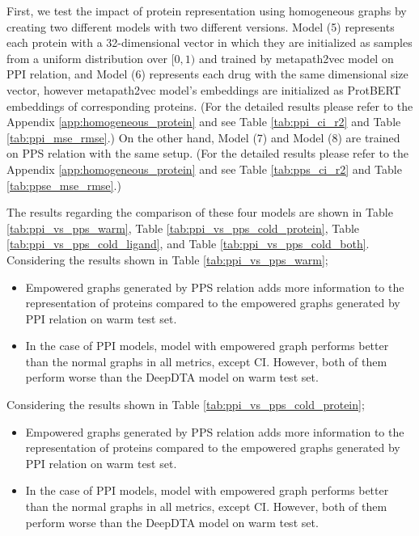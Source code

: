 First, we test the impact of protein representation using homogeneous graphs by creating two different models with two different versions. Model (5) represents each protein with a 32-dimensional vector in which they are initialized as samples from a uniform distribution over $[0, 1)$ and trained by metapath2vec model on PPI relation, and Model (6) represents each drug with the same dimensional size vector, however metapath2vec model's embeddings are initialized as ProtBERT embeddings of corresponding proteins. (For the detailed results please refer to the Appendix \ref{app:homogeneous_protein} and see Table \ref{tab:ppi_ci_r2} and Table \ref{tab:ppi_mse_rmse}.) On the other hand, Model (7) and Model (8) are trained on PPS relation with the same setup. (For the detailed results please refer to the Appendix \ref{app:homogeneous_protein} and see Table \ref{tab:pps_ci_r2} and Table \ref{tab:ppse_mse_rmse}.)

The results regarding the comparison of these four models are shown in Table \ref{tab:ppi_vs_pps_warm}, Table \ref{tab:ppi_vs_pps_cold_protein}, Table  \ref{tab:ppi_vs_pps_cold_ligand}, and Table \ref{tab:ppi_vs_pps_cold_both}. Considering the results shown in Table \ref{tab:ppi_vs_pps_warm};
\begin{itemize}
    \item Empowered graphs generated by PPS relation adds more information to the representation of proteins compared to the empowered graphs generated by PPI relation on warm test set. 
    \item In the case of PPI models, model with empowered graph performs better than the normal graphs in all metrics, except CI. However, both of them perform worse than the DeepDTA model on warm test set.
\end{itemize}

Considering the results shown in Table \ref{tab:ppi_vs_pps_cold_protein};
\begin{itemize}
    \item Empowered graphs generated by PPS relation adds more information to the representation of proteins compared to the empowered graphs generated by PPI relation on warm test set. 
    \item In the case of PPI models, model with empowered graph performs better than the normal graphs in all metrics, except CI. However, both of them perform worse than the DeepDTA model on warm test set.
\end{itemize}



